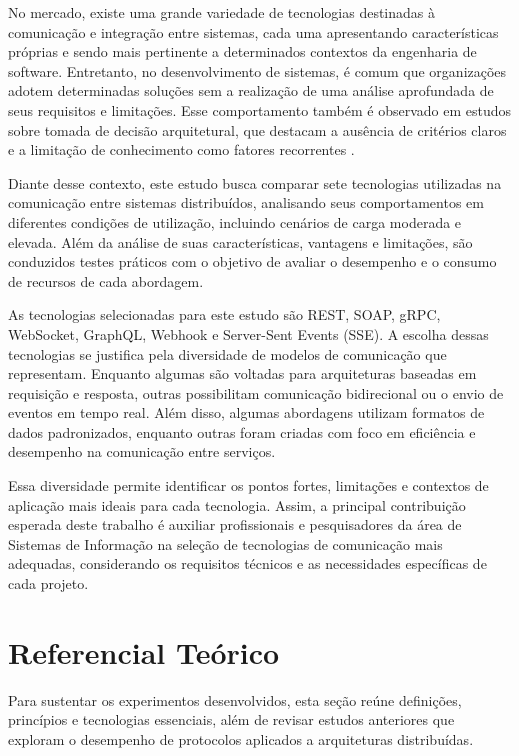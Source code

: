 \documentclass[a4paper,12pt]{article}
\begin{document}
No mercado, existe uma grande variedade de tecnologias destinadas à comunicação e integração entre sistemas, cada uma apresentando características próprias e sendo mais pertinente a determinados contextos da engenharia de software. Entretanto, no desenvolvimento de sistemas, é comum que organizações adotem determinadas soluções sem a realização de uma análise aprofundada de seus requisitos e limitações. Esse comportamento também é observado em estudos sobre tomada de decisão arquitetural, que destacam a ausência de critérios claros e a limitação de conhecimento como fatores recorrentes .

Diante desse contexto, este estudo busca comparar sete tecnologias utilizadas na comunicação entre sistemas distribuídos, analisando seus comportamentos em diferentes condições de utilização, incluindo cenários de carga moderada e elevada. Além da análise de suas características, vantagens e limitações, são conduzidos testes práticos com o objetivo de avaliar o desempenho e o consumo de recursos de cada abordagem.

As tecnologias selecionadas para este estudo são REST, SOAP, gRPC, WebSocket, GraphQL, Webhook e Server-Sent Events (SSE). A escolha dessas tecnologias se justifica pela diversidade de modelos de comunicação que representam. Enquanto algumas são voltadas para arquiteturas baseadas em requisição e resposta, outras possibilitam comunicação bidirecional ou o envio de eventos em tempo real. Além disso, algumas abordagens utilizam formatos de dados padronizados, enquanto outras foram criadas com foco em eficiência e desempenho na comunicação entre serviços.

Essa diversidade permite identificar os pontos fortes, limitações e contextos de aplicação mais ideais para cada tecnologia. Assim, a principal contribuição esperada deste trabalho é auxiliar profissionais e pesquisadores da área de Sistemas de Informação na seleção de tecnologias de comunicação mais adequadas, considerando os requisitos técnicos e as necessidades específicas de cada projeto.

\section{Referencial Teórico}

Para sustentar os experimentos desenvolvidos, esta seção reúne definições, princípios e tecnologias essenciais, além de revisar estudos anteriores que exploram o desempenho de protocolos aplicados a arquiteturas distribuídas.
\end{document}
